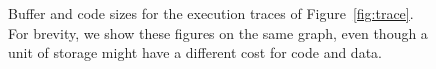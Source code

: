 \begin{comment}

\subsection{Minimum Buffer Size between {\filters}}

As illustrated above, the amount of buffering in a {\pipeline} can
be affected greatly by the order of executions of {\filters} in the
{\pipeline}.  The following equation calculates the minimal buffer
size required in order for two {\filters} to be able to push data
between each other indefinitely in the most buffer-efficient way.
Buffers this size cannot always be achieved, because some
components require that data be buffered up for execution (ex.
{\feedbackloops} require data to exist internally in order to
execution to advance) or because extra latency constrains require
additional buffering.

\begin{equation}
buffer_{A \to B} = \left\lceil {{peek_B} \over {\gcd(push_A,
pop_B)}} - 1 \right\rceil \gcd (push_A, pop_B) + push_A
\end{equation}

\emph{I can explain this equation, but I cannot prove it.  what
should I do with this?  it's not necessary for the thesis, but it
is a neat result we never published (PLDI submission), nor have I
seen it in any other papers (nobody does peeking, so it can't be
anywhere else)}

\end{comment}

\begin{figure}[t]
\caption{\small Buffer and code sizes for the execution traces of
Figure~\ref{fig:trace}.  For brevity, we show these figures on the
same graph, even though a unit of storage might have a different cost
for code and data.\protect\label{fig:codedata}}
\end{figure}
